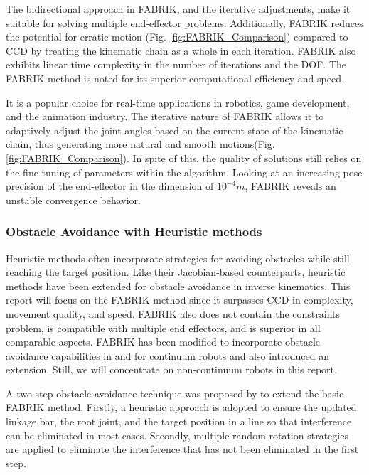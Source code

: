 \documentclass[conference]{IEEEtran}
\begin{document}
The bidirectional approach in FABRIK, and the iterative adjustments, make it suitable for solving multiple end-effector problems. Additionally, FABRIK reduces the potential for erratic motion (Fig. \ref{fig:FABRIK_Comparison}) compared to CCD by treating the kinematic chain as a whole in each iteration. FABRIK also exhibits linear time complexity in the number of iterations and the DOF. The FABRIK method is noted for its superior computational efficiency and speed\cite{aristidou_fabrik_2011} .

It is a popular choice for real-time applications in robotics, game development, and the animation industry\cite{aristidou_fabrik_2011}. The iterative nature of FABRIK allows it to adaptively adjust the joint angles based on the current state of the kinematic chain, thus generating more natural and smooth motions(Fig. \ref{fig:FABRIK_Comparison}). In spite of this, the quality of solutions still relies on the fine-tuning of parameters within the algorithm. Looking at an increasing pose precision of the end-effector in the dimension of $10^{-4}m$, FABRIK reveals an unstable convergence behavior\cite{xu_combined_2023}.

\subsubsection{Obstacle Avoidance with Heuristic methods}
Heuristic methods often incorporate strategies for avoiding obstacles while still reaching the target position. Like their Jacobian-based counterparts, heuristic methods have been extended for obstacle avoidance in inverse kinematics. This report will focus on the FABRIK method since it surpasses CCD in complexity, movement quality, and speed\cite{aristidou_fabrik_2011}. FABRIK also does not contain the constraints problem, is compatible with multiple end effectors, and is superior in all comparable aspects\cite{aristidou_fabrik_2011}. 
FABRIK has been modified to incorporate obstacle avoidance capabilities in \cite{tao_extending_2021}\cite{tao_collision-free_2017} and for continuum robots \cite{wu_novel_2022} and \cite{gerget_collision_2019} also introduced an extension. Still, we will concentrate on non-continuum robots in this report.

A two-step obstacle avoidance technique was proposed by \cite{tao_extending_2021} to extend the basic FABRIK method. Firstly, a heuristic approach is adopted to ensure the updated linkage bar, the root joint, and the target position in a line so that interference can be eliminated in most cases. Secondly, multiple random rotation strategies are applied to eliminate the interference that has not been eliminated in the first step.
\end{document}
